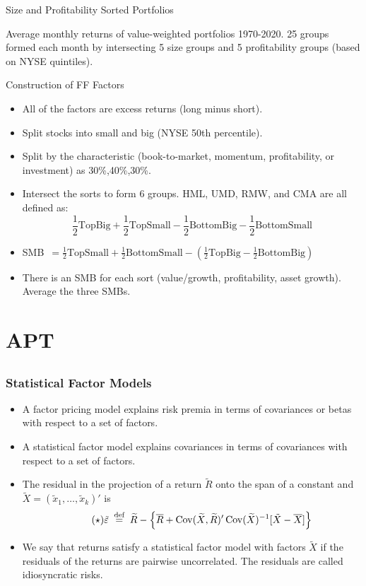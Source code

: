 \documentclass[10pt]{beamer}
\DeclareMathOperator{\Cov}{Cov}
\newcommand{\bi}{\begin{itemize}}
\newcommand{\ei}{\end{itemize}}
\newcommand{\im}{\item}
\newcommand{\bq}{\begin{equation}}
\newcommand{\eq}{\end{equation}}
\newcommand{\eqdef}{\;\buildrel \text{d{}ef}\over = \;}
\newcommand{\bfr}{\begin{frame}}
\newcommand{\tve}{\tilde{\varepsilon}}
\newcommand{\tx}{\tilde{x}}
\newcommand{\tr}{\widetilde{R}}
\newcommand{\tX}{\tilde{X}}
\begin{document}
\begin{frame}{Size and Profitability Sorted Portfolios}

Average monthly returns of value-weighted portfolios 1970-2020.  25 groups formed each month by intersecting 5 size groups and 5 profitability groups (based on NYSE quintiles).

\begin{center}

\end{center}
\end{frame}

\bfr{Construction of FF Factors}
\bi
\im All of the factors are excess returns (long minus short).
\im Split stocks into small and big (NYSE 50th percentile).
\im Split by the characteristic (book-to-market, momentum, profitability, or investment) as 30\%,40\%,30\%.  \im Intersect the sorts to form 6 groups.  HML, UMD, RMW, and CMA are all defined as:
$$\frac{1}{2}\text{TopBig} + \frac{1}{2}\text{TopSmall} - \frac{1}{2}\text{BottomBig} - \frac{1}{2}\text{BottomSmall}$$
\im SMB $\,=\frac{1}{2}\text{TopSmall} + \frac{1}{2}\text{BottomSmall} - \left(\frac{1}{2}\text{TopBig} - \frac{1}{2}\text{BottomBig}\right)$
\im There is an SMB for each sort (value/growth, profitability, asset growth).  Average the three SMBs.
\ei
\end{frame}

\section{APT}\subsection{}

\bfr\frametitle{Statistical Factor Models}
\bi 
\im A factor pricing model explains \alert{risk premia} in terms of covariances or betas with respect to a set of factors.

 \im A statistical factor model explains \alert{covariances} in terms of covariances with respect to a set of factors.

 \im The residual in the projection of a return $\tr$ onto the span of a constant and $\tX = (\tx_1, \ldots, \tx_k)'$ is
\bq\tag{$\star$}
\tve \eqdef \tr - \left\{\overline{R} 
+ \Cov(\widetilde{X},\tr)'\Cov(\widetilde{X})^{-1} [\tX - \overline{X}]\right\}
\eq

 \im We say that returns satisfy a \alert{statistical factor model} with factors $\tX$ if the residuals of the returns are pairwise \alert{uncorrelated}.  The residuals are called idiosyncratic risks.
 \ei 
\end{frame}
\end{document}
